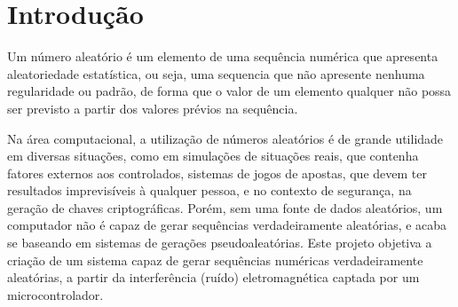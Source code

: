 \section{Introdução}
Um número aleatório é um elemento de uma sequência numérica que apresenta aleatoriedade estatística, ou seja, uma sequencia que não apresente nenhuma regularidade ou padrão, de forma que o valor de um elemento qualquer não possa ser previsto a partir dos valores prévios na sequência.

Na área computacional, a utilização de números aleatórios é de grande utilidade em diversas situações, como em simulações de situações reais, que contenha fatores externos aos controlados, sistemas de jogos de apostas, que devem ter resultados imprevisíveis à qualquer pessoa, e no contexto de segurança, na geração de chaves criptográficas. Porém, sem uma fonte de dados aleatórios, um computador não é capaz de gerar sequências verdadeiramente aleatórias, e acaba se baseando em sistemas de gerações pseudoaleatórias. 
Este projeto objetiva a criação de um sistema capaz de gerar sequências numéricas verdadeiramente aleatórias, a partir da interferência (ruído) eletromagnética captada por um microcontrolador.